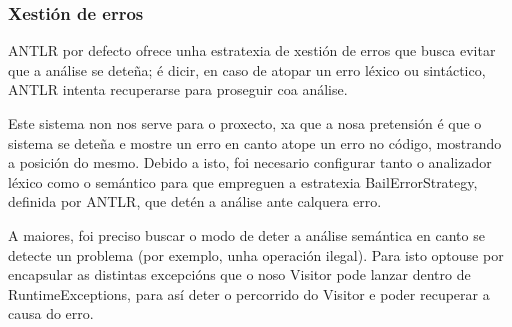 \subsubsection{Xestión de erros}
ANTLR por defecto ofrece unha estratexia de xestión de erros que busca evitar
que a análise se deteña; é dicir, en caso de atopar un erro léxico ou
sintáctico, ANTLR intenta recuperarse para proseguir coa análise.
\par
Este sistema non nos serve para o proxecto, xa que a nosa pretensión é que o
sistema se deteña e mostre un erro en canto atope un erro no código, mostrando a
posición do mesmo. Debido a isto, foi necesario configurar tanto o analizador
léxico como o semántico para que empreguen a estratexia BailErrorStrategy,
definida por ANTLR, que detén a análise ante calquera erro.
\par
A maiores, foi preciso buscar o modo de deter a análise semántica en canto se
detecte un problema (por exemplo, unha operación ilegal). Para isto optouse por
encapsular as distintas excepcións que o noso Visitor pode lanzar dentro de
RuntimeExceptions, para así deter o percorrido do Visitor e poder recuperar a
causa do erro.

